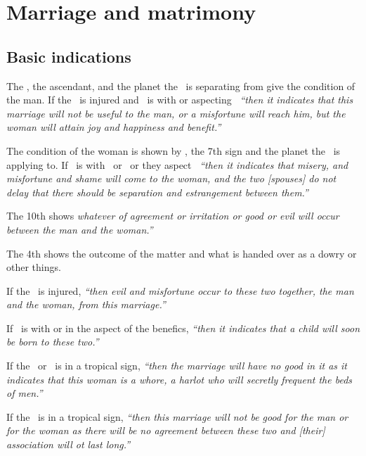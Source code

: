 \section{Marriage and matrimony}
\subsection{Basic indications}
The \Sun, the ascendant, and the planet the \Moon\, is separating from give the condition of the man. If the \Sun\, is injured and  \Venus\, is with or aspecting \Jupiter\, \textsl{``then it indicates that this marriage will not be useful to the man, or a misfortune will reach him, but the woman will attain joy and happiness and benefit.''}

The condition of the woman is shown by \Venus, the 7th sign and the planet the \Moon\, is applying to. If \Venus\, is with \Mars\, or \Saturn\, or they aspect \Venus\, \textsl{``then it indicates that misery, and misfortune and shame will come to the woman, and the two [spouses] do not delay that there should be separation and estrangement between them.''}

The 10th shows \textsl{whatever of agreement or irritation or good or evil will occur between the man and the woman.''}

The 4th shows the outcome of the matter and what is handed over as a dowry or other things.

If the \Moon\, is injured, \textsl{``then evil and misfortune occur to these two together, the man and the woman, from this marriage.''}

If \Mercury\, is with or in the aspect of the benefics, \textsl{``then it indicates that a child will soon be born to these two.''}

If the \Moon\, or \Venus\, is in a tropical sign, \textsl{``then the marriage will have no good in it as it indicates that this woman is a whore, a harlot who will secretly frequent the beds of men.''}

If the \Moon\, is in a tropical sign, \textsl{``then this marriage will not be good for the man or for the woman as there will be no agreement between these two and [their] association will ot last long.''}

